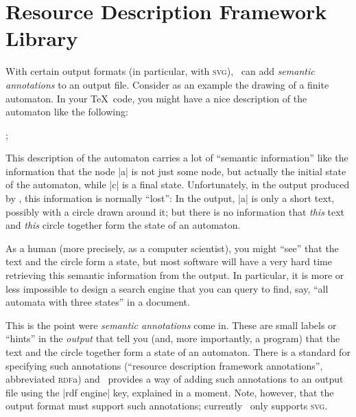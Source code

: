 %
%
%


\section{Resource Description Framework Library}
\label{section-library-rdf}
\label{section-tikz-rdf}

With  certain output
formats (in particular, with \textsc{svg}), \tikzname\ can add \emph{semantic
annotations} to an output file. Consider as an example the drawing of a finite
automaton. In your \TeX\ code, you might have a nice description of the
automaton like the following:
%
\begin{codeexample}
\tikz[automaton] ;
\end{codeexample}
%
This description of the automaton carries a lot of ``semantic information''
like the information that the node |a| is not just some node, but actually the
initial state of the automaton, while |c| is a final state. Unfortunately, in
the output produced by \tikzname, this information is normally ``lost'': In the
output, |a| is only a short text, possibly with a circle drawn around it; but
there is no information that \emph{this} text and \emph{this} circle together
form the state of an automaton.

As a human (more precisely, as a computer scientist), you might ``see'' that
the text and the circle form a state, but most software will have a very hard
time retrieving this semantic information from the output. In particular, it is
more or less impossible to design a search engine that you can query to find,
say, ``all automata with three states'' in a document.

This is the point were \emph{semantic annotations} come in. These are small
labels or ``hints'' in the \emph{output} that tell you (and, more importantly,
a program) that the text and the circle together form a state of an automaton.
There is a standard for specifying such annotations (``resource description
framework annotations'', abbreviated \textsc{rdf}a) and \tikzname\ provides a
way of adding such annotations to an output file using the |rdf engine| key,
explained in a moment. Note, however, that the output format must support such
annotations; currently \tikzname\ only supports \textsc{svg}.



